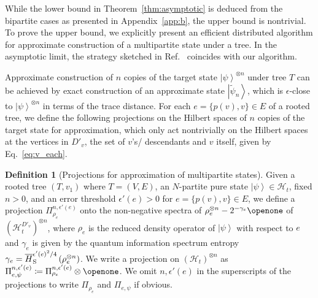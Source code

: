 \documentclass[preprintnumbers,aps,amsmath,amssymb,pra,twocolumn,showpacs,superscriptaddress,floatfix]{revtex4-1}
\def\Ket#1{\left|#1\right\rangle}
\theoremstyle{plain}
\theoremstyle{definition}
\newtheorem{definition}[theorem]{Definition}
\theoremstyle{remark}
\begin{document}
While the lower bound in Theorem~\ref{thm:asymptotic} is deduced from the bipartite cases as presented in Appendix~\ref{app:b}, the upper bound is nontrivial.  To prove the upper bound, we explicitly present an efficient distributed algorithm for approximate construction of a multipartite state under a tree.  In the asymptotic limit, the strategy sketched in Ref.~\cite{RefWorks:148} coincides with our algorithm.

Approximate construction of $n$ copies of the target state $\Ket{\psi}^{\otimes n}$ under tree $T$ can be achieved by exact construction of an approximate state $\Ket{\tilde\psi_n}$, which is $\epsilon$-close to $\Ket{\psi}^{\otimes n}$ in terms of the trace distance.   For each $e = \{p(v),v\}\in E$ of a rooted tree, we define the following projections on the Hilbert spaces of $n$ copies of the target state for approximation, which only act nontrivially on the Hilbert spaces at the vertices in $D'_v$,  the set of $v$'s/ descendants and $v$ itself, given by Eq.~\eqref{eq:v_each}.

\begin{definition}[Projections for approximation of multipartite states]
\label{def:projection}
Given a rooted tree $(T, v_1)$ where $T=(V,E)$, an $N$-partite pure state $\Ket{\psi}\in\mathcal{H}_t$, fixed $n>0$, and an error threshold $\epsilon'(e)>0$ for $e = \{p(v),v\}\in E$, we define a projection $\Pi_{\rho_e}^{n,\epsilon'(e)}$ onto the non-negative spectra of $\rho_e^{\otimes n}-2^{-\gamma_e}\openone$ of ${\left(\mathcal{H}^{D'_v}_t\right)}^{\otimes n}$, where $\rho_e$ is the reduced density operator of $\Ket{\psi}$ with respect to $e$ and $\gamma_e$ is given by the quantum information spectrum entropy $\gamma_e=\overline{H}_{\textup{S}}^{{\epsilon'(e)}^2/4}\left(\rho_e^{\otimes n}\right)$. We write a projection on ${(\mathcal{H}_t)}^{\otimes n}$  as $\Pi_{e,\psi}^{n,\epsilon'(e)}\coloneqq\Pi_{\rho_e}^{n,\epsilon'(e)}\otimes\openone$.  We omit $n,\epsilon'(e)$ in the superscripts of the projections to write $\Pi_{\rho_e}$ and $\Pi_{e,\psi}$ if obvious.
\end{definition}
\end{document}
